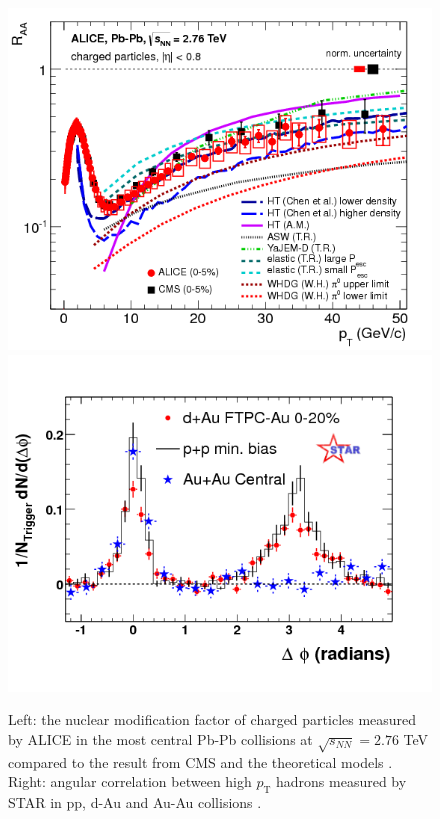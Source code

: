 \documentclass[b5paper,10pt,twoside,oldstyle,classica]{toptesi}
\newcommand{\pt}{p_\text{T}}
\begin{document}
\begin{figure}[tb]
\begin{center}
\includegraphics[scale = 0.29]{raa_charged.png}
\hspace{0cm}
\includegraphics[scale = 0.29]{jetquenching.png}
\caption{Left: the nuclear modification factor of charged particles measured by ALICE in the most central Pb-Pb collisions at $\sqrt{s_{NN}} = 2.76$ TeV compared to the result from CMS and the theoretical models \cite{Abelev:2012hxa}. Right: angular correlation between high $\pt$ hadrons measured by STAR in pp, d-Au and Au-Au collisions \cite{Adams:2006yt}.}
\label{jetquench}
\end{center}
\end{figure}
\end{document}
